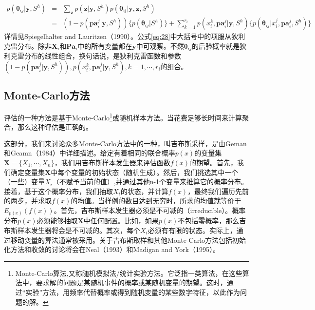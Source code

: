 \documentclass[10pt,a4paper]{article}
\begin{document}
\begin{CJK*}{UTF8}{gkai}
\begin{eqnarray}
\label{eq:28}
p(\boldsymbol{\theta}_{ij}|\boldsymbol{y},S^h)&=&
\sum_{\boldsymbol{z}} p(\boldsymbol{z}|\boldsymbol{y},S^h)p(\boldsymbol{\theta_{ij}}|\boldsymbol{y},\boldsymbol{z},S^h)\\
&=&(1-p(\boldsymbol{pa}_i^j|\boldsymbol{y},S^h))\{p(\boldsymbol{\theta}_{ij}|S^h)\}+
\sum_{k=1}^{r_i}p(x_i^k,\boldsymbol{pa}_i^j|\boldsymbol{y},S^h)\{p(\boldsymbol{\theta}_{ij}|x_i^j,\boldsymbol{pa}_i^j,S^h)\}\nonumber
\end{eqnarray}
详情见Spiegelhalter and Lauritzen（1990）。公式\ref{eq:28}中大括号中的项服从狄利克雷分布。除非$\boldsymbol{X}_i$和$\boldsymbol{Pa}_i$中的所有变量都在$\boldsymbol{y}$中可观察。不然$\boldsymbol{\theta}_{ij}$的后验概率就是狄利克雷分布的线性组合，换句话说，是狄利克雷函数和参数$(1-p(\boldsymbol{pa}_i^j|\boldsymbol{y},S^h)),p(x_i^k,\boldsymbol{pa}_i^j|\boldsymbol{y},S^h),k=1,\cdots,r_i$的组合。


\subsection{Monte-Carlo方法}
评估的一种方法是基于Monte-Carlo\footnote{Monte-Carlo算法,又称随机模拟法/统计实验方法。它泛指一类算法，在这些算法中，要求解的问题是某随机事件的概率或某随机变量的期望。这时，通过“实验”方法，用频率代替概率或得到随机变量的某些数字特征，以此作为问题的解。}或随机样本方法。当花费足够长时间来计算聚合，那么这种评估是正确的。


这部分，我们来讨论众多Monte-Carlo方法中的一种，叫吉布斯采样，是由Geman和Geamn（1984）中详细描述。给定有着相同的联合概率$p(x)$的变量集$\boldsymbol{X}=\{X_1,\cdots,X_n\}$，我们用吉布斯样本发生器来评估函数$f
(x)$的期望。首先，我们确定变量集$\boldsymbol{X}$中每个变量的初始状态（随机生成）。然后，我们挑选其中一个（一些）变量$X_i$（不赋予当前的值）,并通过其他n-1个变量来推算它的概率分布。接着，基于这个概率分布，我们抽取$X_i$的状态，并计算$f(x)$，最终我们遍历先前的两步，并求取$f(x)$的均值。当样例的数目达到无穷时，所求的均值就等价于$E_{p(x)}(f(x))$。首先，吉布斯样本发生器必须是不可减的（irreducible）。概率分布$p(x)$必须能够抽取$\boldsymbol{X}$中任何配置。比如，如果$p(x)$不包括零概率，那么吉布斯样本发生器将会是不可减的。其次，每个$X_i$必须有有限的状态。实际上，通过移动变量的算法通常被采用。关于吉布斯取样和其他Monte-Carlo方法包括初始化方法和收敛的讨论将会在Neal（1993）和Madigan and York（1995）。



\end{CJK*}
\end{document}
